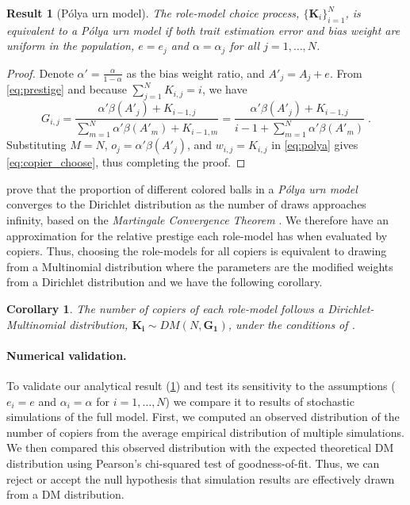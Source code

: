\documentclass[12pt]{extarticle}
\let\vec\mathbf
\newtheorem{corollary}{Corollary}
\newtheorem{result}{Result}
\begin{document}
\begin{result}[P{\'{o}}lya urn model]\label{result:polya}
The role-model choice process, $\big\{\vec{K}_i\big\}_{i=1}^N$, is equivalent to a \textit{P\'{o}lya urn model} if both trait estimation error and bias weight are uniform in the population, $e=e_j$ and $\alpha=\alpha_j$ for all $j=1,\ldots,N$.
\end{result}

\begin{proof} 
Denote $\alpha'=\frac{\alpha}{1-\alpha}$ as the bias weight ratio, and $A'_j=A_j+e$. From \cref{eq:prestige} and because $\sum_{j=1}^{N}{K_{i,j}}=i$, we have
\begin{equation}\label{eq:copier_choose}
G_{i,j} = 
\frac{\alpha'\beta(A'_j) + K_{i-1,j}}{\sum\limits_{m=1}^{N} \alpha'\beta(A'_m) + K_{i-1,m}}
 =\frac{\alpha'\beta(A'_j) + K_{i-1,j}}{i-1 + \sum\limits_{m=1}^{N}\alpha'\beta(A'_m)} \;.
\end{equation}
Substituting $M=N$, $o_j = \alpha'\beta(A'_j)$, and $w_{i,j} = K_{i,j}$ in \cref{eq:polya} gives \cref{eq:copier_choose}, thus completing the proof.
\end{proof} 

\citet[section 2]{dirichlet} prove that the proportion of different colored balls in a \textit{P\'{o}lya urn model} converges to the Dirichlet distribution as the number of draws approaches infinity, based on the \textit{Martingale Convergence Theorem} \citep{martingaleBook}.
We therefore have an approximation for the relative prestige each role-model has when evaluated by copiers. Thus, choosing the role-models for all copiers is equivalent to drawing from a Multinomial distribution where the parameters are the modified weights from a Dirichlet distribution and we have the following corollary.
\\

\begin{corollary}\label{cor:dirichlet}
The number of copiers of each role-model follows a Dirichlet-Multinomial distribution, $\vec{K_i} \sim \textit{DM}(N,\vec{G_1})$, under the conditions of .
\end{corollary}

\paragraph{Numerical validation.}
To validate our analytical result (\cref{cor:dirichlet}) and test its sensitivity to the assumptions ($e_i=e$ and $\alpha_i=\alpha$ for $i=1,\ldots,N$) we compare it to results of stochastic simulations of the full model.
First, we computed an observed distribution of the number of copiers from the average empirical distribution of multiple simulations.
We then compared this observed distribution with the expected theoretical DM distribution using Pearson's chi-squared test of goodness-of-fit. Thus, we can reject or accept the null hypothesis that simulation results are effectively drawn from a DM distribution.
\end{document}
